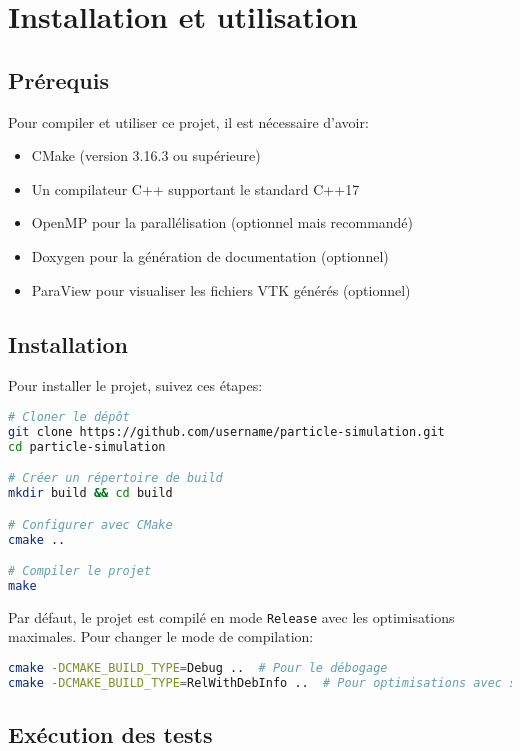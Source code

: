 \documentclass[12pt,a4paper]{article}
\begin{document}
\section{Installation et utilisation}

\subsection{Prérequis}

Pour compiler et utiliser ce projet, il est nécessaire d'avoir:
\begin{itemize}
    \item CMake (version 3.16.3 ou supérieure)
    \item Un compilateur C++ supportant le standard C++17
    \item OpenMP pour la parallélisation (optionnel mais recommandé)
    \item Doxygen pour la génération de documentation (optionnel)
    \item ParaView pour visualiser les fichiers VTK générés (optionnel)
\end{itemize}

\subsection{Installation}

Pour installer le projet, suivez ces étapes:

\begin{lstlisting}[language=bash]
# Cloner le dépôt
git clone https://github.com/username/particle-simulation.git
cd particle-simulation

# Créer un répertoire de build
mkdir build && cd build

# Configurer avec CMake
cmake ..

# Compiler le projet
make
\end{lstlisting}

Par défaut, le projet est compilé en mode \texttt{Release} avec les optimisations maximales. Pour changer le mode de compilation:

\begin{lstlisting}[language=bash]
cmake -DCMAKE_BUILD_TYPE=Debug ..  # Pour le débogage
cmake -DCMAKE_BUILD_TYPE=RelWithDebInfo ..  # Pour optimisations avec symboles
\end{lstlisting}

\subsection{Exécution des tests}
\end{document}
